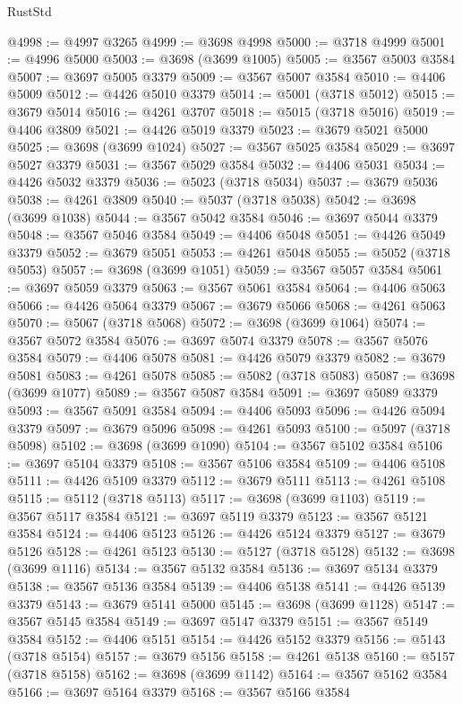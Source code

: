 \begin{lexlean}{RustStd}
\begin{coremodule}
@4998 := @4997 @3265
@4999 := @3698 @4998
@5000 := @3718 @4999
@5001 := @4996 @5000
@5003 := @3698 (@3699 @1005)
@5005 := @3567 @5003 @3584
@5007 := @3697 @5005 @3379
@5009 := @3567 @5007 @3584
@5010 := @4406 @5009
@5012 := @4426 @5010 @3379
@5014 := @5001 (@3718 @5012)
@5015 := @3679 @5014
@5016 := @4261 @3707
@5018 := @5015 (@3718 @5016)
@5019 := @4406 @3809
@5021 := @4426 @5019 @3379
@5023 := @3679 @5021 @5000
@5025 := @3698 (@3699 @1024)
@5027 := @3567 @5025 @3584
@5029 := @3697 @5027 @3379
@5031 := @3567 @5029 @3584
@5032 := @4406 @5031
@5034 := @4426 @5032 @3379
@5036 := @5023 (@3718 @5034)
@5037 := @3679 @5036
@5038 := @4261 @3809
@5040 := @5037 (@3718 @5038)
@5042 := @3698 (@3699 @1038)
@5044 := @3567 @5042 @3584
@5046 := @3697 @5044 @3379
@5048 := @3567 @5046 @3584
@5049 := @4406 @5048
@5051 := @4426 @5049 @3379
@5052 := @3679 @5051
@5053 := @4261 @5048
@5055 := @5052 (@3718 @5053)
@5057 := @3698 (@3699 @1051)
@5059 := @3567 @5057 @3584
@5061 := @3697 @5059 @3379
@5063 := @3567 @5061 @3584
@5064 := @4406 @5063
@5066 := @4426 @5064 @3379
@5067 := @3679 @5066
@5068 := @4261 @5063
@5070 := @5067 (@3718 @5068)
@5072 := @3698 (@3699 @1064)
@5074 := @3567 @5072 @3584
@5076 := @3697 @5074 @3379
@5078 := @3567 @5076 @3584
@5079 := @4406 @5078
@5081 := @4426 @5079 @3379
@5082 := @3679 @5081
@5083 := @4261 @5078
@5085 := @5082 (@3718 @5083)
@5087 := @3698 (@3699 @1077)
@5089 := @3567 @5087 @3584
@5091 := @3697 @5089 @3379
@5093 := @3567 @5091 @3584
@5094 := @4406 @5093
@5096 := @4426 @5094 @3379
@5097 := @3679 @5096
@5098 := @4261 @5093
@5100 := @5097 (@3718 @5098)
@5102 := @3698 (@3699 @1090)
@5104 := @3567 @5102 @3584
@5106 := @3697 @5104 @3379
@5108 := @3567 @5106 @3584
@5109 := @4406 @5108
@5111 := @4426 @5109 @3379
@5112 := @3679 @5111
@5113 := @4261 @5108
@5115 := @5112 (@3718 @5113)
@5117 := @3698 (@3699 @1103)
@5119 := @3567 @5117 @3584
@5121 := @3697 @5119 @3379
@5123 := @3567 @5121 @3584
@5124 := @4406 @5123
@5126 := @4426 @5124 @3379
@5127 := @3679 @5126
@5128 := @4261 @5123
@5130 := @5127 (@3718 @5128)
@5132 := @3698 (@3699 @1116)
@5134 := @3567 @5132 @3584
@5136 := @3697 @5134 @3379
@5138 := @3567 @5136 @3584
@5139 := @4406 @5138
@5141 := @4426 @5139 @3379
@5143 := @3679 @5141 @5000
@5145 := @3698 (@3699 @1128)
@5147 := @3567 @5145 @3584
@5149 := @3697 @5147 @3379
@5151 := @3567 @5149 @3584
@5152 := @4406 @5151
@5154 := @4426 @5152 @3379
@5156 := @5143 (@3718 @5154)
@5157 := @3679 @5156
@5158 := @4261 @5138
@5160 := @5157 (@3718 @5158)
@5162 := @3698 (@3699 @1142)
@5164 := @3567 @5162 @3584
@5166 := @3697 @5164 @3379
@5168 := @3567 @5166 @3584

\end{coremodule}
\end{lexlean}
